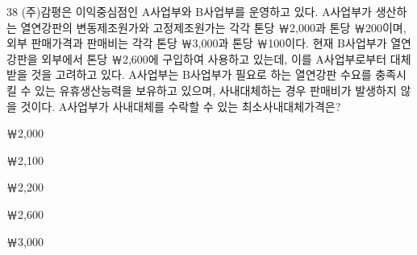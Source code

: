 \begin{question}{38}
(주)감평은 이익중심점인 A사업부와 B사업부를 운영하고 있다. A사업부가 생산하는 열연강판의 변동제조원가와 고정제조원가는 각각 톤당 ￦2,000과 톤당 ￦200이며, 외부 판매가격과 판매비는 각각 톤당 ￦3,000과 톤당 ￦100이다. 현재 B사업부가 열연강판을 외부에서 톤당 ￦2,600에 구입하여 사용하고 있는데, 이를 A사업부로부터 대체받을 것을 고려하고 있다. A사업부는 B사업부가 필요로 하는 열연강판 수요를 충족시킬 수 있는 유휴생산능력을 보유하고 있으며, 사내대체하는 경우 판매비가 발생하지 않을 것이다. A사업부가 사내대체를 수락할 수 있는 최소사내대체가격은?
\begin{choices}
  \item ￦2,000
  \item ￦2,100
  \item ￦2,200
  \item ￦2,600
  \item ￦3,000
\end{choices}
\end{question}
